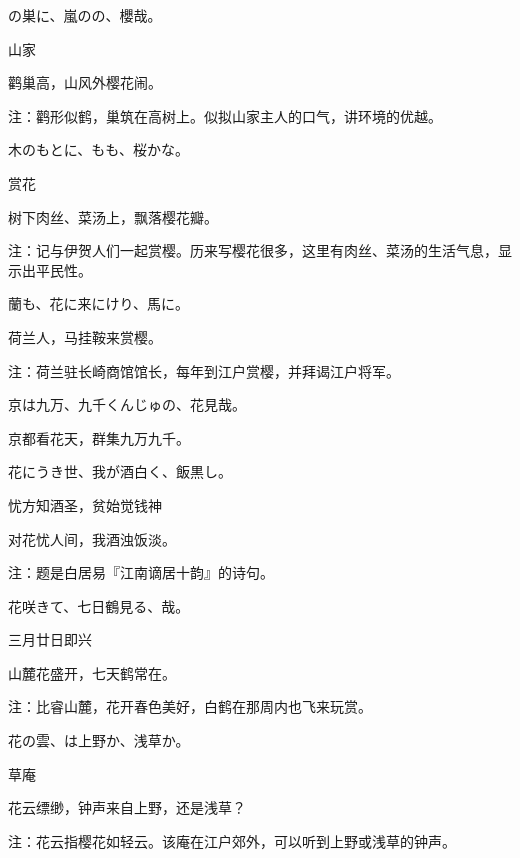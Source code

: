 \begin{haiku}
    {\FH {}の巣に、嵐のの、櫻哉。}

    {\FK 山家}

    {\FK 鹳巢高，山风外樱花闹。}

    {\FT 注：鹳形似鹤，巢筑在高树上。似拟山家主人的口气，讲环境的优越。}
\end{haiku}

\begin{haiku}
    {\FH 木のもとに、もも、桜かな。}

    {\FK 赏花}

    {\FK 树下肉丝、菜汤上，飘落樱花瓣。}

    {\FT 注：记与伊贺人们一起赏樱。历来写樱花很多，这里有肉丝、菜汤的生活气息，显示出平民性。}
\end{haiku}

\begin{haiku}
    {\FH {}蘭も、花に来にけり、馬に。}

    {\FK 荷兰人，马挂鞍来赏樱。}

    {\FT 注：荷兰驻长崎商馆馆长，每年到江户赏樱，并拜谒江户将军。}
\end{haiku}

\begin{haiku}
    {\FH 京は九万、九千くんじゅの、花見哉。}

    {\FK 京都看花天，群集九万九千。}
\end{haiku}

\begin{haiku}
    {\FH 花にうき世、我が酒白く、飯黒し。}

    {\FK 忧方知酒圣，贫始觉钱神}

    {\FK 对花忧人间，我酒浊饭淡。}

    {\FT 注：题是白居易『江南谪居十韵』的诗句。}
\end{haiku}

\begin{haiku}
    {\FH 花咲きて、七日鶴見る、哉。}

    {\FK 三月廿日即兴}

    {\FK 山麓花盛开，七天鹤常在。}

    {\FT 注：比睿山麓，花开春色美好，白鹤在那周内也飞来玩赏。}
\end{haiku}

\begin{haiku}
    {\FH 花の雲、は上野か、浅草か。}

    {\FK 草庵}

    {\FK 花云缥缈，钟声来自上野，还是浅草？}

    {\FT 注：花云指樱花如轻云。该庵在江户郊外，可以听到上野或浅草的钟声。}
\end{haiku}

